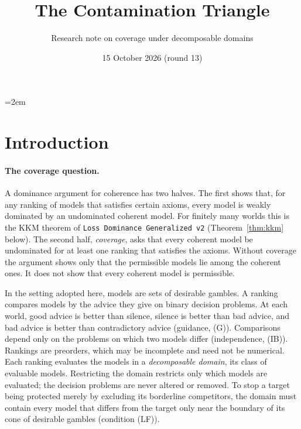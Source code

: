 \documentclass[11pt]{article}
\title{The Contamination Triangle}
\author{Research note on coverage under decomposable domains}
\date{15 October 2026 (round 13)}
\theoremstyle{definition}
\theoremstyle{remark}
\newcommand{\src}[1]{\texttt{#1}}
\begin{document}
\emergencystretch=2em
\maketitle

\section{Introduction}\label{sec:intro}

\paragraph{The coverage question.}
A dominance argument for coherence has two halves. The first shows that, for any ranking of models that satisfies certain axioms, every model is weakly dominated by an undominated coherent model. For finitely many worlds this is the KKM theorem of \src{Loss Dominance Generalized v2} (Theorem~\ref{thm:kkm} below). The second half, \emph{coverage}, asks that every coherent model be undominated for at least one ranking that satisfies the axioms. Without coverage the argument shows only that the permissible models lie among the coherent ones. It does not show that every coherent model is permissible.

In the setting adopted here, models are sets of desirable gambles. A ranking compares models by the advice they give on binary decision problems. At each world, good advice is better than silence, silence is better than bad advice, and bad advice is better than contradictory advice (guidance, (G)). Comparisons depend only on the problems on which two models differ (independence, (IB)). Rankings are preorders, which may be incomplete and need not be numerical. Each ranking evaluates the models in a \emph{decomposable domain}, its class of evaluable models. Restricting the domain restricts only which models are evaluated; the decision problems are never altered or removed. To stop a target being protected merely by excluding its borderline competitors, the domain must contain every model that differs from the target only near the boundary of its cone of desirable gambles (condition (LF)).
\end{document}
